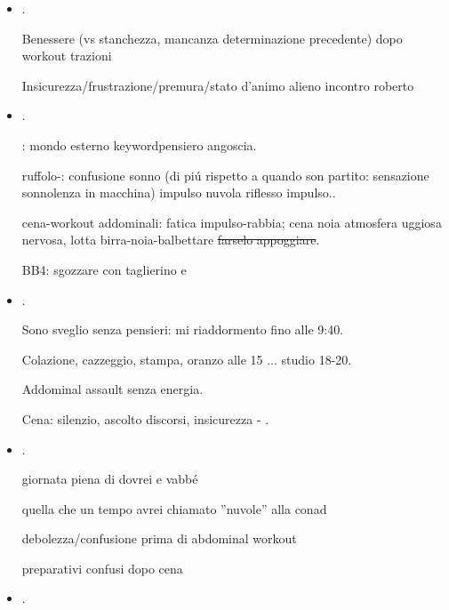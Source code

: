 \begin{itemize}
Mattina - mal di stomaco - Mangiare per mandare gi\'u

workout a met\'a-Pranzo-sonno

Dopo pisolo continua insicurezza gessosa: non riesco a  con 


\item {}.

Benessere (vs stanchezza, mancanza determinazione precedente) dopo workout trazioni

Insicurezza/frustrazione/premura/stato d'animo alieno incontro roberto

\item {}.

: mondo esterno keyword{pensiero angoscia}.

ruffolo-: confusione sonno (di pi\'u rispetto a quando son partito: sensazione sonnolenza in macchina) impulso nuvola riflesso impulso..

cena-workout addominali: fatica  impulso-rabbia; cena noia atmosfera uggiosa nervosa, lotta birra-noia-balbettare \sout{farselo appoggiare}.

BB4: sgozzare con taglierino e 

\item {}.

Sono sveglio senza pensieri: mi riaddormento fino alle 9:40.

Colazione, cazzeggio, stampa, oranzo alle 15 ... studio 18-20.

Addominal assault senza energia.

Cena: silenzio, ascolto discorsi, insicurezza - .

\item {}.

giornata piena di dovrei e vabb\'e

quella che un tempo avrei chiamato ''nuvole'' alla conad

debolezza/confusione prima di abdominal workout

preparativi confusi dopo cena

\item {}.


\end{itemize}
